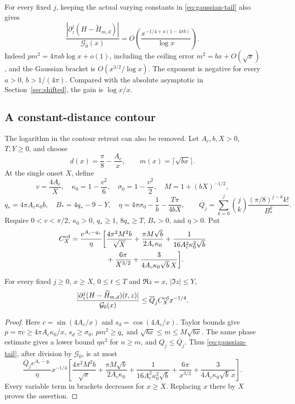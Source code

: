For every fixed $j$, keeping the actual varying constants in
\eqref{eq:gaussian-tail} also gives
\[
 \frac{|\partial_z^j(H-\widetilde H_{m,d})|}{\mathcal G_0(x)}
 =O\left(\frac{x^{-1/4+a(1-4\pi b)}}{\log x}\right).
\]
Indeed $pm^2=4\pi ab\log x+o(1)$, including the ceiling error
$m^2=bx+O(\sqrt x)$, and the Gaussian bracket is
$O(x^{3/2}/\log x)$. The exponent is negative for every
$a>0$, $b>1/(4\pi)$. Compared with the absolute asymptotic in
Section~\ref{sec:shifted}, the gain is $\log x/x$.

\subsection{A constant-distance contour}

The logarithm in the contour retreat can also be removed. Let
$A_c,b,X>0$, $T,Y\ge0$, and choose
\[
 d(x)=\frac\pi8-\frac{A_c}{x},\qquad m(x)=\lceil\sqrt{bx}\rceil.
\]
At the single onset $X$, define
\[
 v=\frac{4A_c}{X},\quad \kappa_0=1-\frac{v^2}6,\quad
 \sigma_0=1-\frac{v^2}2,\quad M=1+(bX)^{-1/2},
\]
\[
 q_*=4\pi A_c\kappa_0b,\quad B_*=4q_*-9-Y,\quad
 \eta=4\pi\sigma_0-\frac1b-\frac{T\pi}{4bX},\qquad
 \overline Q_j=\sum_{k=0}^j\binom jk
                 \frac{(\pi/8)^{j-k}k!}{B_*^k}.
\]
Require $0<v<\pi/2$, $\kappa_0>0$, $q_*\ge1$, $8q_*\ge T$,
$B_*>0$, and $\eta>0$. Put
\begin{align}
 C_X^{\rm cd}=\frac{e^{A_c-q_*}}\eta\bigg[
 &\frac{4\pi^2M^2b}{\sqrt X}
 +\frac{\pi M\sqrt b}{2A_c\kappa_0}
 +\frac1{16A_c^2\kappa_0^2\sqrt b}\notag\\
 &+\frac{6\pi}{X^{3/2}}
 +\frac3{4A_c\kappa_0\sqrt b\,X}\bigg].
 \label{eq:cd-constant}
\end{align}

\begin{theorem}\label{thm:constant-distance}
For every fixed $j\ge0$, $x\ge X$, $0\le t\le T$ and
$\Re z=x$, $|\Im z|\le Y$,
\begin{equation}\label{eq:constant-distance}
 \frac{|\partial_z^j(H-\widetilde H_{m,d})(t,z)|}{\mathcal G_0(x)}
 \le\overline Q_j C_X^{\rm cd}x^{-1/4}.
\end{equation}
\end{theorem}
\begin{proof}
Here $c=\sin(4A_c/x)$ and $s_d=\cos(4A_c/x)$. Taylor bounds give
$p=\pi c\ge4\pi A_c\kappa_0/x$, $s_d\ge\sigma_0$,
$pm^2\ge q_*$ and $\sqrt{bx}\le m\le M\sqrt{bx}$.
The same phase estimate gives a lower bound $\eta n^2$ for $n\ge m$,
and $Q_j\le\overline Q_j$. Thus \eqref{eq:gaussian-tail}, after division
by $\mathcal G_0$, is at most
\[
 \frac{\overline Q_j e^{A_c-q_*}}\eta x^{-1/4}
 \left[\frac{4\pi^2M^2b}{\sqrt x}
 +\frac{\pi M\sqrt b}{2A_c\kappa_0}
 +\frac1{16A_c^2\kappa_0^2\sqrt b}
 +\frac{6\pi}{x^{3/2}}+\frac3{4A_c\kappa_0\sqrt b\,x}\right].
\]
Every variable term in brackets decreases for $x\ge X$.
Replacing $x$ there by $X$ proves the assertion.
\end{proof}


